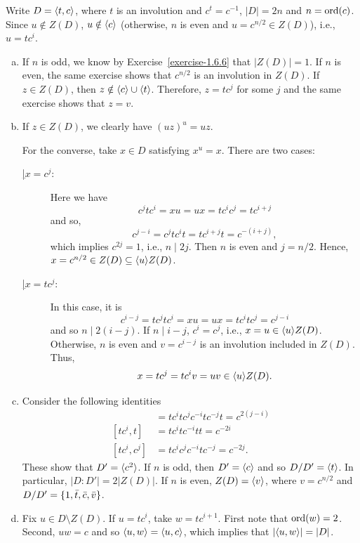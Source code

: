 \begin{solution} Write $D=\langle t,c\rangle$, where $t$ is an involution and $c^t=c^{-1}$, $|D|=2n$ and $n={\rm ord}(c)$. Since $u\notin Z(D)$, $u\notin\langle c\rangle$ (otherwise, $n$ is even and $u=c^{n/2}\in Z(D)$), i.e., $u=tc^i$.
\begin{enumerate}[a),font=\upshape]
    \item If $n$ is odd, we know by Exercise~\ref{exercise-1.6.6} that $|Z(D)|=1$. If $n$ is even, the same exercise shows that $c^{n/2}$ is an involution in $Z(D)$. If $z\in Z(D)$, then $z\notin\langle c\rangle\cup\langle t\rangle$. Therefore, $z=tc^j$ for some $j$ and the same exercise shows that $z=v$.
    \item If $z\in Z(D)$, we clearly have $(uz)^u=uz$.
    
    For the converse, take $x\in D$ satisfying $x^u=x$. There are two cases:

    \begin{description}
        \item[\underline{\vphantom|$x=c^j$}:] Here we have
    $$
        c^jtc^i=xu=ux=tc^ic^j=tc^{i+j}
    $$
    and so,
    $$
        c^{j-i}=c^jtc^it = tc^{i+j}t=c^{-(i+j)},
    $$
    which implies $c^{2j}=1$, i.e., $n\mid 2j$. Then $n$ is even and $j=n/2$. Hence, $x=c^{n/2}\in Z(D)\subseteq\langle u\rangle Z(D)$.

    \item[\underline{\vphantom|$x=tc^j$}:] In this case, it is
    $$
        c^{i-j}= tc^jtc^i = xu=ux=tc^itc^j = c^{j-i}
    $$
    and so $n\mid2(i-j)$. If $n\mid i-j$, $c^i=c^j$, i.e., $x=u\in\langle u\rangle Z(D)$. Otherwise, $n$ is even and $v=c^{i-j}$ is an involution included in $Z(D)$. Thus,
    $$
        x=tc^j=tc^iv=uv\in\langle u\rangle Z(D).
    $$
    \end{description}

    \item Consider the following identities
    \begin{align*}
        [tc^i,tc^j] &= tc^itc^jc^{-i}tc^{-j}t = c^{2(j-i)}\\
        [tc^i,t] &= tc^itc^{-i}tt = c^{-2i}\\
        [tc^i,c^j] &= tc^ic^jc^{-i}tc^{-j} = c^{-2j}.
    \end{align*}
    These show that $D'=\langle c^2\rangle$. If $n$ is odd, then $D'=\langle c\rangle$ and so $D/D'=\langle t\rangle$. In particular, $|D:D'|=2|Z(D)|$. If $n$ is even, $Z(D)=\langle v\rangle$, where $v=c^{n/2}$ and $D/D'=\{1,\bar t,\bar c, \bar v\}$.

    \item Fix $u\in D\setminus Z(D)$. If $u=tc^i$, take $w=tc^{i+1}$. First note that ${\rm ord}(w)=2$. Second, $uw=c$ and so $\langle u,w\rangle=\langle u,c\rangle$, which implies that $|\langle u,w\rangle|=|D|$.
\end{enumerate}
\end{solution}

